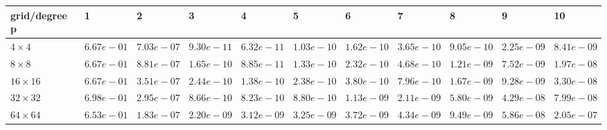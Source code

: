 \begin{tabular}{lllllllllll}
\hline
 grid/degree p   & 1          & 2          & 3          & 4          & 5          & 6          & 7          & 8          & 9          & 10         \\
\hline
 $4 \times 4$    & $6.67e-01$ & $7.03e-07$ & $9.30e-11$ & $6.32e-11$ & $1.03e-10$ & $1.62e-10$ & $3.65e-10$ & $9.05e-10$ & $2.25e-09$ & $8.41e-09$ \\
 $8 \times 8$    & $6.67e-01$ & $8.81e-07$ & $1.65e-10$ & $8.85e-11$ & $1.33e-10$ & $2.32e-10$ & $4.68e-10$ & $1.21e-09$ & $7.52e-09$ & $1.97e-08$ \\
 $16 \times 16$  & $6.67e-01$ & $3.51e-07$ & $2.44e-10$ & $1.38e-10$ & $2.38e-10$ & $3.80e-10$ & $7.96e-10$ & $1.67e-09$ & $9.28e-09$ & $3.30e-08$ \\
 $32 \times 32$  & $6.98e-01$ & $2.95e-07$ & $8.66e-10$ & $8.23e-10$ & $8.80e-10$ & $1.13e-09$ & $2.11e-09$ & $5.80e-09$ & $4.29e-08$ & $7.99e-08$ \\
 $64 \times 64$  & $6.53e-01$ & $1.83e-07$ & $2.20e-09$ & $3.12e-09$ & $3.25e-09$ & $3.72e-09$ & $4.34e-09$ & $9.49e-09$ & $5.86e-08$ & $2.05e-07$ \\
\hline
\end{tabular}